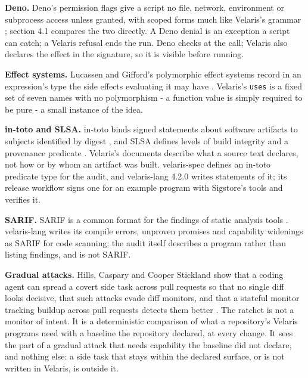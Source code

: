 \documentclass[
]{article}
\begin{document}
\textbf{Deno.} Deno's permission flags give a script no file, network,
environment or subprocess access unless granted, with scoped forms much
like Velaris's grammar \citep{deno_security}; section 4.1 compares the
two directly. A Deno denial is an exception a script can catch; a
Velaris refusal ends the run. Deno checks at the call; Velaris also
declares the effect in the signature, so it is visible before running.

\textbf{Effect systems.} Lucassen and Gifford's polymorphic effect
systems record in an expression's type the side effects evaluating it
may have \citep{lucassen1988effects}. Velaris's \texttt{uses} is a fixed
set of seven names with no polymorphism - a function value is simply
required to be pure - a small instance of the idea.

\textbf{in-toto and SLSA.} in-toto binds signed statements about
software artifacts to subjects identified by digest
\citep{torresarias2019intoto, intoto_attestation}, and SLSA defines
levels of build integrity and a provenance predicate \citep{slsa}.
Velaris's documents describe what a source text declares, not how or by
whom an artifact was built. velaris-spec defines an in-toto predicate
type for the audit, and velaris-lang 4.2.0 writes statements of it; its
release workflow signs one for an example program with Sigstore's tools
and verifies it.

\textbf{SARIF.} SARIF is a common format for the findings of static
analysis tools \citep{sarif2020}. velaris-lang writes its compile
errors, unproven promises and capability widenings as SARIF for code
scanning; the audit itself describes a program rather than listing
findings, and is not SARIF.

\textbf{Gradual attacks.} Hills, Caspary and Cooper Stickland show that
a coding agent can spread a covert side task across pull requests so
that no single diff looks decisive, that such attacks evade diff
monitors, and that a stateful monitor tracking buildup across pull
requests detects them better \citep{hills2026distributed}. The ratchet
is not a monitor of intent. It is a deterministic comparison of what a
repository's Velaris programs need with a baseline the repository
declared, at every change. It sees the part of a gradual attack that
needs capability the baseline did not declare, and nothing else: a side
task that stays within the declared surface, or is not written in
Velaris, is outside it.
\end{document}
